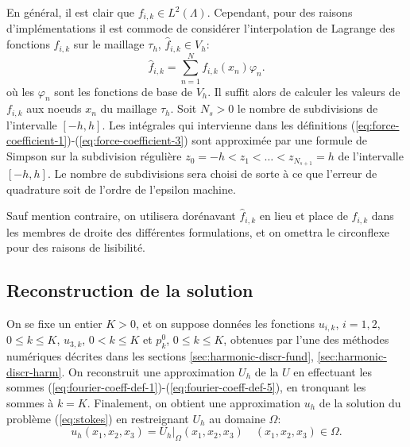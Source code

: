 En général, il est clair que $f_{i,k} \in
L^2(\Lambda)$. Cependant, pour des raisons d'implémentations il est commode
de considérer l'interpolation de Lagrange des fonctions $f_{i,k}$
sur le maillage $\tau_h$, $\hat f_{i,k}\in V_h$:
\begin{equation}
  \hat f_{i,k} = \sum_{n = 1}^{N} f_{i,k}(x_n)\varphi_n.
\end{equation}
où les $\varphi_n$ sont les fonctions de base de $V_h$.  Il suffit
alors de calculer les valeurs de $f_{i,k}$ aux noeuds $x_n$ du maillage
$\tau_h$. Soit $N_s > 0$ le nombre de subdivisions de l'intervalle $[-h,
  h]$. Les intégrales qui intervienne dans les définitions
(\ref{eq:force-coefficient-1})-(\ref{eq:force-coefficient-3}) sont
approximée par une formule de Simpson sur la subdivision
régulière $z_0 = -h < z_1 < \dots < z_{N_{s+1}} = h$ de
l'intervalle $[-h, h]$. Le nombre de subdivisions sera choisi de
sorte à ce que l'erreur de quadrature soit de l'ordre de
l'epsilon machine.

Sauf mention contraire, on utilisera dorénavant $\hat f_{i,k}$ en
lieu et place de $f_{i,k}$ dans les membres de droite des
différentes formulations, et on omettra le circonflexe pour des
raisons de lisibilité.



\subsection{Reconstruction de la solution}\label{sec:u-h}
On se fixe un entier $K > 0$, et on suppose données les fonctions
$u_{i,k}$, $i = 1,2$, $0 \leq k \leq K$, $u_{3,k}$, $0 < k \leq K$ et
$p_k^0$, $0 \leq k \leq K$, obtenues par l'une des méthodes
numériques décrites dans les sections
\ref{sec:harmonic-discr-fund}, \ref{sec:harmonic-discr-harm}. On
reconstruit une approximation $U_h$ de la $U$ en effectuant les sommes
(\ref{eq:fourier-coeff-def-1})-(\ref{eq:fourier-coeff-def-5}), en
tronquant les sommes à $k = K$. Finalement, on obtient une
approximation $u_h$ de la solution du problème
(\ref{eq:stokes}) en restreignant $U_h$ au domaine $\Omega$:
\begin{equation}\label{eq:u-h}
  u_h(x_1, x_2, x_3) = U_h|_\Omega(x_1, x_2,x_3)\quad (x_1, x_2,
  x_3)\in\Omega.
\end{equation}
